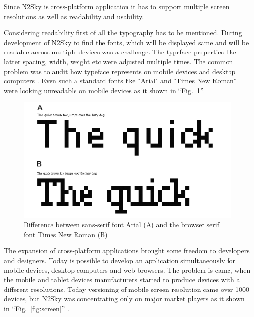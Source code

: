 Since N2Sky is cross-platform application it has to support multiple screen resolutions as well as readability and usability. 

Considering readability first of all the typography has to be mentioned. During development of N2Sky to find the fonts, which will be displayed same and will be readable across multiple devices was a challenge. The typeface \cite{wiki:typeface} properties like latter spacing, width, weight etc were adjusted multiple times. The common problem was to audit how typeface represents on mobile devices and desktop computers \cite{responsive_book}. Even such a standard fonts like "Arial" and "Times New Roman" were looking unreadable on mobile devices as it shown in ``Fig.~\ref{fig:typo}''.

\begin{figure}[htbp]
\begin{center}
  \includegraphics[scale=0.65]{components/3/components/typo.png}
  \caption{Difference between sans-serif font Arial (A) and the browser serif font Times New Roman (B) }
  \label{fig:typo}
\end{center}
\end{figure}

The expansion of cross-platform applications brought some freedom to developers and designers. Today is possible to develop an application simultaneously for mobile devices, desktop computers and web browsers. The problem is came, when the mobile and tablet devices manufacturers started to produce devices with a different resolutions. Today versioning of mobile screen resolution came over 1000 devices, but N2Sky was concentrating only on major market players as it shown in ``Fig.~\ref{fig:screen}'' \cite{mobile_resolution}.

